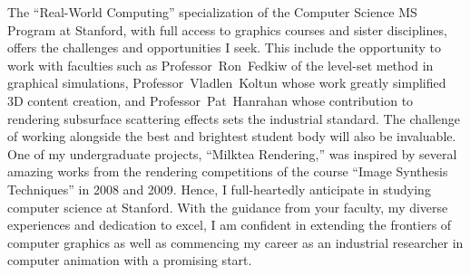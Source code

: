 \documentclass[a4paper, 11pt]{article}
\begin{document}
The ``Real-World Computing'' specialization of the Computer Science MS Program at Stanford, with full access to graphics courses and sister disciplines, offers the challenges and opportunities I seek. This include the opportunity to work with faculties such as \mbox{Professor~Ron~Fedkiw} of the level-set method in graphical simulations, \mbox{Professor~Vladlen~Koltun} whose work greatly simplified 3D content creation, and \mbox{Professor~Pat~Hanrahan} whose contribution to rendering subsurface scattering effects sets the industrial standard. The challenge of working alongside the best and brightest student body will also be invaluable. One of my undergraduate projects, ``Milktea Rendering,'' was inspired by several amazing works from the rendering competitions of the course ``Image Synthesis Techniques'' in 2008 and 2009. Hence, I full-heartedly anticipate in studying computer science at Stanford. With the guidance from your faculty, my diverse experiences and dedication to excel, I am confident in extending the frontiers of computer graphics as well as commencing my career as an industrial researcher in computer animation with a promising start.

\end{document}
